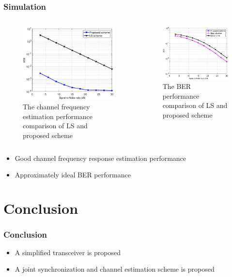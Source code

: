 \documentclass[8 pt]{beamer} %
\begin{document}
\begin{frame}
\frametitle{Simulation}
\begin{columns}[c]
\begin{figure}[!htb]
    	\centering \includegraphics[width=6cm]{channel_estimation_HMSE.eps}
		\caption{The channel frequency estimation performance comparison of LS and proposed scheme}
        \label{fig:channel_estimation_HMSE}
\end{figure}
\begin{figure}[!htb]
    	\centering \includegraphics[width=6cm]{channel_estimation_BER.eps}
		\caption{The BER performance comparison of LS and proposed scheme} \label{fig:channel_estimation_BER}
\end{figure}
\end{columns}
\begin{itemize}
\item Good channel frequency response estimation performance 
\item Approximately ideal BER performance
\end{itemize}

\end{frame}


\section{Conclusion}
\begin{frame}
\frametitle{Conclusion}
\begin{block}{}
\begin{itemize}
\item A simplified transceiver is proposed
\item A joint synchronization and channel estimation scheme is proposed
\end{itemize}
\end{block}
\end{frame}
\end{document}
